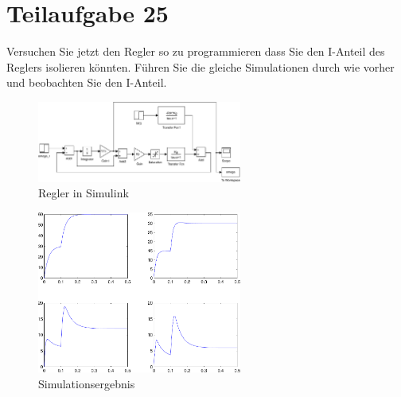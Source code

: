 \section{Teilaufgabe 25}
\begin{aufgabe}
    Versuchen Sie jetzt den Regler so zu programmieren dass Sie den I-Anteil 
    des Reglers isolieren könnten. Führen Sie die gleiche Simulationen durch 
    wie vorher und beobachten Sie den I-Anteil.
\end{aufgabe}
\begin{figure}[h!]
    \centering
    \includegraphics[width=0.6\textwidth]{25/regler_sat_isep.pdf}
    \caption{Regler in Simulink}
    \label{fig:25}
\end{figure}
\begin{figure}[h!]
    \centering
    \includegraphics[width=0.6\textwidth]{25/regler_sat_isep_plot.pdf}
    \caption{Simulationsergebnis}
    \label{fig:25plot}
\end{figure}
